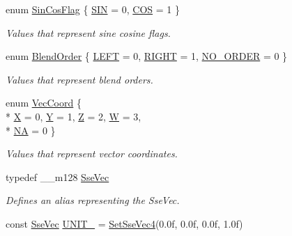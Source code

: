 \begin{DoxyCompactItemize}
\item 
enum \hyperlink{namespacegofxmath_a67a56526fdca522579dadeb59e2cedaa}{Sin\+Cos\+Flag} \{ \hyperlink{namespacegofxmath_a67a56526fdca522579dadeb59e2cedaaa4c66cfae8f94035eaede20844570a27f}{S\+I\+N} = 0, 
\hyperlink{namespacegofxmath_a67a56526fdca522579dadeb59e2cedaaac06d99c0a383a5ea3aca59fa2f00f519}{C\+O\+S} = 1
 \}
\begin{DoxyCompactList}\small\item\em Values that represent sine cosine flags. \end{DoxyCompactList}\item 
enum \hyperlink{namespacegofxmath_a2dce5f39d4af2a18b930b7eee34e034f}{Blend\+Order} \{ \hyperlink{namespacegofxmath_a2dce5f39d4af2a18b930b7eee34e034fab28013e6e287ee6b2890c0809dc4eb50}{L\+E\+F\+T} = 0, 
\hyperlink{namespacegofxmath_a2dce5f39d4af2a18b930b7eee34e034fa3949eb6190e4e02933ded246a5d8fb11}{R\+I\+G\+H\+T} = 1, 
\hyperlink{namespacegofxmath_a2dce5f39d4af2a18b930b7eee34e034fa6fd5e4e8e4bb7db4dd9086e8a5e313a4}{N\+O\+\_\+\+O\+R\+D\+E\+R} = 0
 \}
\begin{DoxyCompactList}\small\item\em Values that represent blend orders. \end{DoxyCompactList}\item 
enum \hyperlink{namespacegofxmath_a6c05153fd2e2d4119d91daca01a06741}{Vec\+Coord} \{ \\*
\hyperlink{namespacegofxmath_a6c05153fd2e2d4119d91daca01a06741a1b2cd11034f7c778f8e0930f57a15577}{X} = 0, 
\hyperlink{namespacegofxmath_a6c05153fd2e2d4119d91daca01a06741a98d90627fe2347723d56eb2b5fd7492d}{Y} = 1, 
\hyperlink{namespacegofxmath_a6c05153fd2e2d4119d91daca01a06741a56adb0786cb240ee8baed7fe3e48c58e}{Z} = 2, 
\hyperlink{namespacegofxmath_a6c05153fd2e2d4119d91daca01a06741ae38bfc064233b06432b115dca29d5c5a}{W} = 3, 
\\*
\hyperlink{namespacegofxmath_a6c05153fd2e2d4119d91daca01a06741a9fc8bb14e129d2beab9c4027f9c0beef}{N\+A} = 0
 \}
\begin{DoxyCompactList}\small\item\em Values that represent vector coordinates. \end{DoxyCompactList}\item 
typedef \+\_\+\+\_\+m128 \hyperlink{namespacegofxmath_a634570ddcd2496053ee966227080e02f}{Sse\+Vec}
\begin{DoxyCompactList}\small\item\em Defines an alias representing the Sse\+Vec. \end{DoxyCompactList}\item 
\hypertarget{namespacegofxmath_abb9f5b43ffde326d3e63609f1d89d7d1}{}const \hyperlink{namespacegofxmath_a634570ddcd2496053ee966227080e02f}{Sse\+Vec} \hyperlink{namespacegofxmath_abb9f5b43ffde326d3e63609f1d89d7d1}{U\+N\+I\+T\+\_} = \hyperlink{namespacegofxmath_a5c69ea49b97ced58947fec384517442d}{Set\+Sse\+Vec4}(0.\+0f, 0.\+0f, 0.\+0f, 1.\+0f)\label{namespacegofxmath_abb9f5b43ffde326d3e63609f1d89d7d1}


\end{DoxyCompactItemize}
